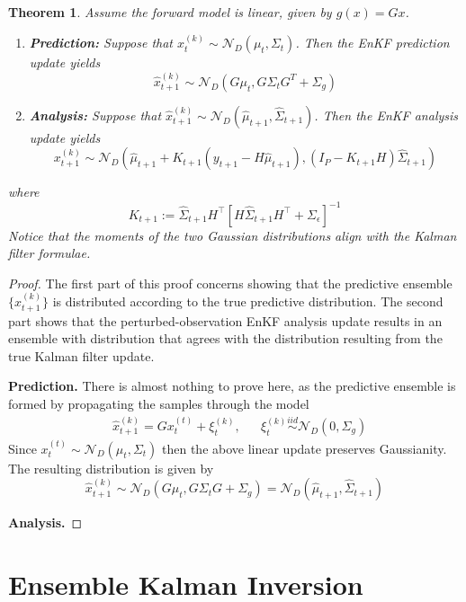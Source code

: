 \documentclass[12pt]{article}
\newtheorem{thm}{Theorem}
\begin{document}
\begin{thm} 
Assume the forward model is linear, given by $g(x) = Gx$. 
\begin{enumerate}
\item \textbf{Prediction:} Suppose that $x^{(k)}_{t} \sim \mathcal{N}_D(\mu_t, \Sigma_t)$. Then the EnKF prediction update yields 
\[\hat{x}^{(k)}_{t + 1} \sim \mathcal{N}_D(G\mu_t, G\Sigma_t G^T + \Sigma_g)\] 
\item \textbf{Analysis:} Suppose that $\hat{x}^{(k)}_{t + 1} \sim \mathcal{N}_D(\hat{\mu}_{t+1}, \hat{\Sigma}_{t+1})$. Then the EnKF analysis update yields 
\[x^{(k)}_{t+1} \sim \mathcal{N}_D(\hat{\mu}_{t+1} + K_{t+1}(y_{t+1} - H\hat{\mu}_{t+1}), \left(I_P - K_{t+1}H \right)\hat{\Sigma}_{t+1})\]
\end{enumerate}
where 
\[K_{t+1} := \hat{\Sigma}_{t+1} H^{\top} \left[H\hat{\Sigma}_{t+1} H^\top + \Sigma_{\epsilon} \right]^{-1} \]
Notice that the moments of the two Gaussian distributions align with the Kalman filter formulae. 
\end{thm}

\begin{proof} 
The first part of this proof concerns showing that the predictive ensemble $\{\hat{x}^{(k)}_{t+1}\}$ is distributed according to the true predictive distribution.
 The second part shows that the perturbed-observation EnKF analysis update results in an ensemble with distribution that agrees with the distribution 
 resulting from the true Kalman filter update.  
 
\bigskip
\noindent
\textbf{Prediction.} There is almost nothing to prove here, as the predictive ensemble is formed by propagating the samples through the model 
\begin{align*}
&\hat{x}^{(k)}_{t+1} = Gx_t^{(t)} + \xi^{(k)}_t, && \xi^{(k)}_t \overset{iid}{\sim} \mathcal{N}_D(0, \Sigma_g) 
\end{align*}
Since $x_t^{(t)} \sim \mathcal{N}_D(\mu_t, \Sigma_t)$ then the above linear update preserves Gaussianity. The resulting distribution is given by 
\[\hat{x}^{(k)}_{t+1} \sim \mathcal{N}_D(G\mu_t, G\Sigma_t G + \Sigma_g) = \mathcal{N}_D(\hat{\mu}_{t+1}, \hat{\Sigma}_{t+1})\]



\bigskip
\noindent
\textbf{Analysis.}

\end{proof}

\section{Ensemble Kalman Inversion}
\end{document}
